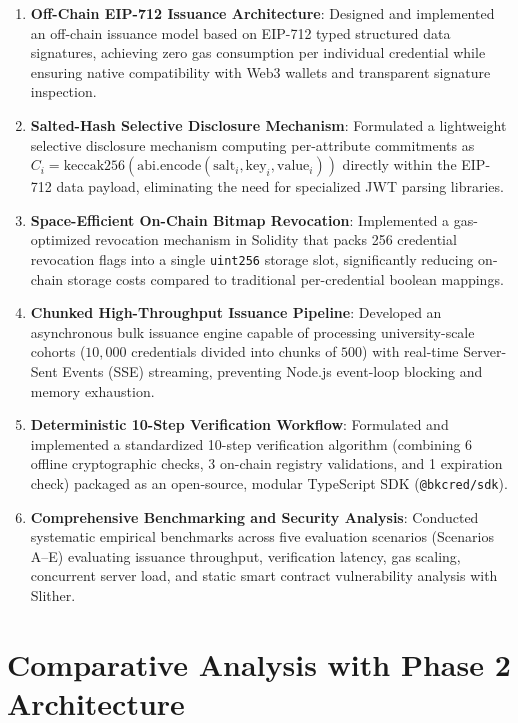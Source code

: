 \begin{enumerate}
    \item \textbf{Off-Chain EIP-712 Issuance Architecture}: Designed and implemented an off-chain issuance model based on EIP-712 typed structured data signatures, achieving zero gas consumption per individual credential while ensuring native compatibility with Web3 wallets and transparent signature inspection.
    
    \item \textbf{Salted-Hash Selective Disclosure Mechanism}: Formulated a lightweight selective disclosure mechanism computing per-attribute commitments as $C_i = \text{keccak256}(\text{abi.encode}(\text{salt}_i, \text{key}_i, \text{value}_i))$ directly within the EIP-712 data payload, eliminating the need for specialized JWT parsing libraries.
    
    \item \textbf{Space-Efficient On-Chain Bitmap Revocation}: Implemented a gas-optimized revocation mechanism in Solidity that packs 256 credential revocation flags into a single \texttt{uint256} storage slot, significantly reducing on-chain storage costs compared to traditional per-credential boolean mappings.
    
    \item \textbf{Chunked High-Throughput Issuance Pipeline}: Developed an asynchronous bulk issuance engine capable of processing university-scale cohorts ($10{,}000$ credentials divided into chunks of $500$) with real-time Server-Sent Events (SSE) streaming, preventing Node.js event-loop blocking and memory exhaustion.
    
    \item \textbf{Deterministic 10-Step Verification Workflow}: Formulated and implemented a standardized 10-step verification algorithm (combining 6 offline cryptographic checks, 3 on-chain registry validations, and 1 expiration check) packaged as an open-source, modular TypeScript SDK (\texttt{@bkcred/sdk}).
    
    \item \textbf{Comprehensive Benchmarking and Security Analysis}: Conducted systematic empirical benchmarks across five evaluation scenarios (Scenarios A--E) evaluating issuance throughput, verification latency, gas scaling, concurrent server load, and static smart contract vulnerability analysis with Slither.
\end{enumerate}

\section{Comparative Analysis with Phase 2 Architecture}

